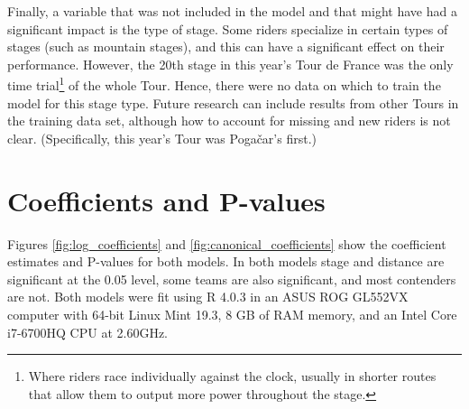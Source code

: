 \documentclass[aos,preprint]{imsart}
\begin{document}
Finally, a variable that was not included in the model and that might have had a significant impact is the type of stage. Some riders specialize in certain types of stages (such as mountain stages), and this can have a significant effect on their performance. However, the 20th stage in this year's Tour de France was the only time trial\footnote{Where riders race individually against the clock, usually in shorter routes that allow them to output more power throughout the stage.} of the whole Tour. Hence, there were no data on which to train the model for this stage type. Future research can include results from other Tours in the training data set, although how to account for missing and new riders is not clear. (Specifically, this year's Tour was Pogačar's first.) \\



\FloatBarrier
\clearpage
\small



\clearpage
\appendix

\section{Coefficients and P-values}


Figures \ref{fig:log_coefficients} and \ref{fig:canonical_coefficients} show the coefficient estimates and P-values for both models. In both models stage and distance are significant at the 0.05 level, some teams are also significant, and most contenders are not. Both models were fit using \textsf{R} 4.0.3 \citep{R} in an ASUS ROG GL552VX computer with 64-bit Linux Mint 19.3, 8 GB of RAM memory, and an Intel Core i7-6700HQ CPU at 2.60GHz.
\end{document}
